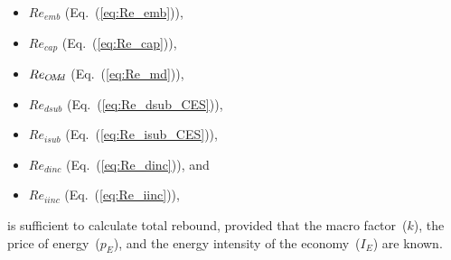 \begin{itemize}

  \item $Re_{emb}$ (Eq.~(\ref{eq:Re_emb})), 

  \item $Re_{cap}$ (Eq.~(\ref{eq:Re_cap})), 
  
  \item $Re_{O\!M\!d}$ (Eq.~(\ref{eq:Re_md})),
  
  \item $Re_{dsub}$ (Eq.~(\ref{eq:Re_dsub_CES})),
  
  \item $Re_{isub}$ (Eq.~(\ref{eq:Re_isub_CES})), 
  
  \item $Re_{dinc}$ (Eq.~(\ref{eq:Re_dinc})), and
  
  \item $Re_{iinc}$ (Eq.~(\ref{eq:Re_iinc})),

\end{itemize}
%
is sufficient to calculate total rebound, 
provided that 
the macro factor~($k$),
the price of energy~($p_E$), and
the energy intensity of the economy~($I_E$) 
are known.
